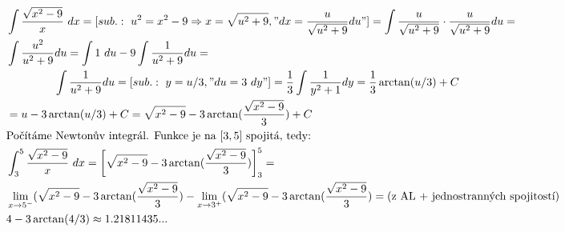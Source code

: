 \documentclass[a4paper]{article}
\begin{document}
\text{}\vspace{-0.1cm}
{\fontsize{12}{15}\selectfont \hspace{-0.5cm}}

\section{}
\begin{align*}
	& \int \frac{\sqrt{x^2 -9}}{x}\ dx = [sub.:\  u^2 = x^2-9 \Rightarrow x = \sqrt{u^2+9}, "dx = \frac{u}{\sqrt{u^2+9}}du"] = \int \frac{u}{\sqrt{u^2+9}} \cdot \frac{u}{\sqrt{u^2+9}} du = \\
	& \int \frac{u^2}{u^2+9} du = \int 1\ du - 9 \int \frac{1}{u^2+9} du = \\
	& \hspace{1.5cm} \int \frac{1}{u^2+9} du = [sub.:\ y = u/3, "du = 3\ dy"] = \frac{1}{3} \int \frac{1}{y^2+1} dy = \frac{1}{3} \arctan(u/3) +C \\
	& = u-3 \arctan(u/3) + C = \sqrt{x^2-9} -  3 \arctan(\frac{\sqrt{x^2-9}}{3}) +C \\
	& \text{Počítáme Newtonův integrál. Funkce je na $[3, 5]$ spojitá, tedy:} \\
	& \int _3^5 \frac{\sqrt{x^2 -9}}{x}\ dx =  \bigg[\sqrt{x^2-9} -  3 \arctan(\frac{\sqrt{x^2-9}}{3}) \bigg]_3^5=\\
	& \lim_{x \rightarrow 5^-}(\sqrt{x^2-9} -  3 \arctan(\frac{\sqrt{x^2-9}}{3}) - \lim_{x \rightarrow 3^+}(\sqrt{x^2-9} -  3 \arctan(\frac{\sqrt{x^2-9}}{3}) = \text{(z AL + jednostranných spojitostí)}\\
	& 4-3\arctan(4/3) \approx  1.21811435... 
\end{align*}
\end{document}

